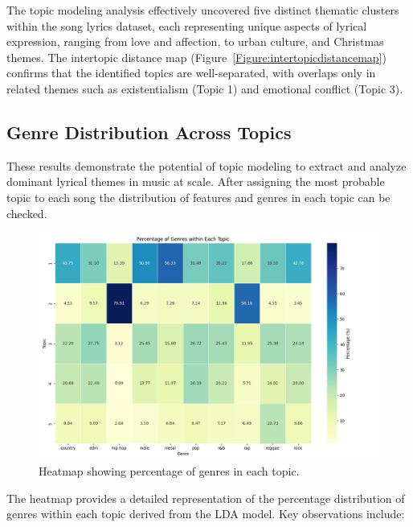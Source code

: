 The topic modeling analysis effectively uncovered five distinct thematic
clusters within the song lyrics dataset, each representing unique aspects of
lyrical expression, ranging from love and affection, to urban culture, and
Christmas themes. The intertopic distance map
(Figure~\ref{Figure:intertopicdistancemap}) confirms that the identified topics
are well-separated, with overlaps only in related themes such as existentialism
(Topic 1) and emotional conflict (Topic 3).


\subsection{Genre Distribution Across Topics}
These results demonstrate the potential of topic modeling to extract and
analyze dominant lyrical themes in music at scale. After assigning the most
probable topic to each song the distribution of features and genres in each
topic can be checked.


\begin{center}
\begin{figure}[H]
  \centering
  \includegraphics[width=5in]{img/lda_genres_distribution.png}
  \caption{Heatmap showing percentage of genres in each topic.}
  \label{Figure:fig_eh}
\end{figure}
\end{center}

The heatmap provides a detailed representation of the percentage distribution
of genres within each topic derived from the LDA model. Key observations
include:

